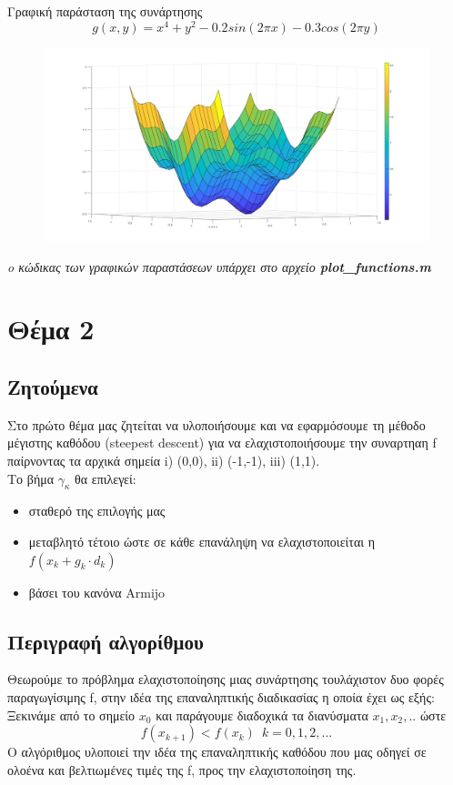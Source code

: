 \documentclass{article}
\begin{document}
Γραφική παράσταση της συνάρτησης 
\begin{equation*}
g(x,y) = x^4 + y^2 - 0.2sin(2πx) - 0.3cos(2πy)
\end{equation*}
\begin{figure}[h!]	
     \centering  
     \advance\leftskip-0.2cm  
  \includegraphics[width=130mm,scale=2]{functionG.jpg}
\end{figure} 

\textit{o κώδικας των γραφικών παραστάσεων υπάρχει στο αρχείο \textbf{plot\_functions.m}}
\clearpage
\section*{Θέμα 2}
\subsection*{Ζητούμενα}
Στο πρώτο θέμα μας ζητείται να υλοποιήσουμε και να εφαρμόσουμε τη μέθοδο μέγιστης καθόδου (steepest descent) για να ελαχιστοποιήσουμε την συναρτηαη f παίρνοντας τα αρχικά σημεία i) (0,0), ii) (-1,-1), iii) (1,1).\\Το βήμα $γ_κ$ θα επιλεγεί:
\begin{itemize}
\item σταθερό της επιλογής μας
\item μεταβλητό τέτοιο ώστε σε κάθε επανάληψη να ελαχιστοποιείται η $f(x_k+g_k \cdot d_k )$ 
\item  βάσει του κανόνα Armijo
\end{itemize}
\subsection*{Περιγραφή αλγορίθμου}
Θεωρούμε το πρόβλημα ελαχιστοποίησης μιας συνάρτησης τουλάχιστον δυο φορές παραγωγίσιμης f, στην ιδέα της επαναληπτικής διαδικασίας η οποία έχει ως εξής:\\
Ξεκινάμε από το σημείο $x_0$ και παράγουμε διαδοχικά τα διανύσματα $x_1,x_2,..$ ώστε
\begin{equation*}
f(x_{k+1}) < f(x_k) \enspace k=0,1,2,...
\end{equation*} 
Ο αλγόριθμος υλοποιεί την ιδέα της επαναληπτικής καθόδου που μας οδηγεί σε ολοένα και βελτιωμένες τιμές της f, προς την ελαχιστοποίηση της.  
\end{document}
